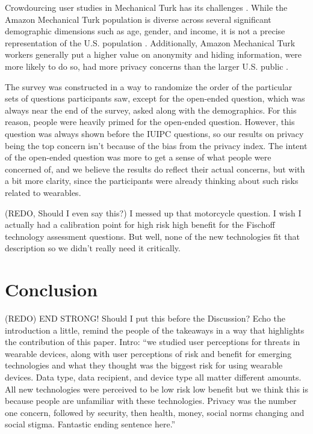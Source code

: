 \documentclass{acm_proc_article-sp}
\begin{document}
Crowdourcing user studies in Mechanical Turk has its challenges \cite{kittur2008crowdsourcing}. While the Amazon Mechanical Turk population is diverse across several significant demographic dimensions such as age, gender, and income, it is not a precise representation of the U.S. population \cite{ross2010crowdworkers}\cite{kelley2010conducting}. Additionally, Amazon Mechanical Turk workers generally put a higher value on anonymity and hiding information, were more likely to do so, had more privacy concerns than the larger U.S. public \cite{kang2014privacy}. 

The survey was constructed in a way to randomize the order of the particular sets of questions participants saw, except for the open-ended question, which was always near the end of the survey, asked along with the demographics. For this reason, people were heavily primed for the open-ended question. However, this question was always shown before the IUIPC questions, so our results on privacy being the top concern isn't because of the bias from the privacy index. The intent of the open-ended question  was more to get a sense of what people were concerned of, and we believe the results do reflect their actual concerns, but with a bit more clarity, since the participants were already thinking about such risks related to wearables. 

(REDO, Should I even say this?) I messed up that motorcycle question. I wish I actually had a calibration point for high risk high benefit for the Fischoff technology assessment questions. But well, none of the new technologies fit that description so we didn't really need it critically. 


\section{Conclusion}
(REDO) END STRONG! Should I put this before the Discussion?  Echo the introduction a little, remind the people of the takeaways in a way that highlights the contribution of this paper. Intro: ``we studied user perceptions for threats in wearable devices, along with user perceptions of risk and benefit for emerging technologies and what they thought was the biggest risk for using wearable devices. Data type, data recipient, and device type all matter different amounts. All new technologies were perceived to be low risk low benefit but we think this is because people are unfamiliar with these technologies. Privacy was the number one concern, followed by security, then health, money, social norms changing and social stigma. Fantastic ending sentence here.''
\end{document}

